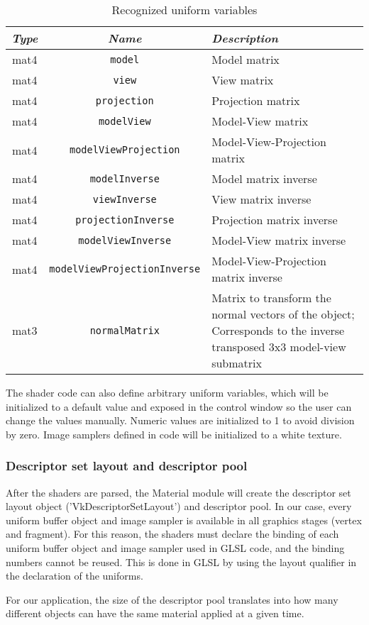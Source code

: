 \begin{table}[h]
    \centering
    \caption{Recognized uniform variables}
    \begin{tabular}{|c|c|p{6cm}|}
        \hline
        \textit{Type} & \textit{Name} & \textit{Description} \\
        \hline
        \hline
        mat4 & \texttt{model} & Model matrix \\
        mat4 & \texttt{view} & View matrix \\
        mat4 & \texttt{projection} & Projection matrix \\
        mat4 & \texttt{modelView} & Model-View matrix \\
        mat4 & \texttt{modelViewProjection} & Model-View-Projection matrix \\
        mat4 & \texttt{modelInverse} & Model matrix inverse \\
        mat4 & \texttt{viewInverse} & View matrix inverse \\
        mat4 & \texttt{projectionInverse} & Projection matrix inverse \\
        mat4 & \texttt{modelViewInverse} & Model-View matrix inverse \\
        mat4 & \texttt{modelViewProjectionInverse} & Model-View-Projection matrix inverse \\
        mat3 & \texttt{normalMatrix} & Matrix to transform the normal vectors of the object; Corresponds to the inverse transposed 3x3 model-view submatrix \\
        \hline
    \end{tabular}
    \label{tab:uniform_variables}
\end{table}

The shader code can also define arbitrary uniform variables, which will be initialized to a default value and exposed in the control window so the user can change the values manually. Numeric values are initialized to 1 to avoid division by zero. Image samplers defined in code will be initialized to a white texture.

\subsubsection{Descriptor set layout and descriptor pool}
After the shaders are parsed, the Material module will create the descriptor set layout object ('VkDescriptorSetLayout') and descriptor pool. In our case, every uniform buffer object and image sampler is available in all graphics stages (vertex and fragment). For this reason, the shaders must declare the binding of each uniform buffer object and image sampler used in GLSL code, and the binding numbers cannot be reused. This is done in GLSL by using the layout qualifier in the declaration of the uniforms.

For our application, the size of the descriptor pool translates into how many different objects can have the same material applied at a given time.
